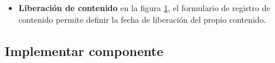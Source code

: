 \begin{itemize}
\item \textbf{Liberación de contenido} en la figura
\ref{fig:Formulario registro de contenido}, el formulario de registro de
contenido permite definir la fecha de liberación del propio contenido.

\begin{figure}[H]
	\centering
	\label{fig:Formulario registro de contenido}
\end{figure}

\end{itemize}
	
\subsection{Implementar componente}

